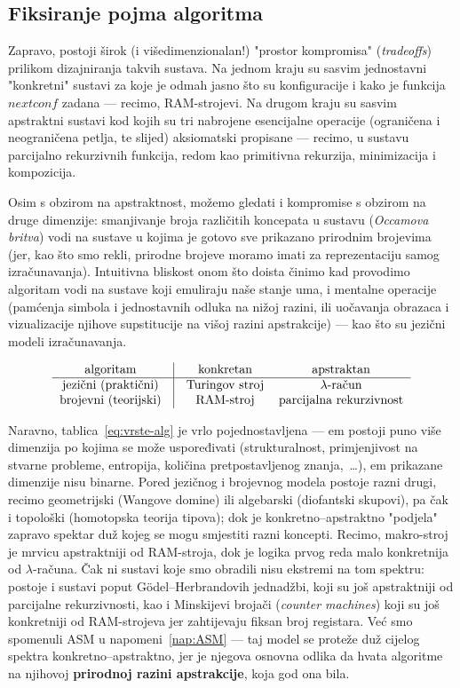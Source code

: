 \subsection{Fiksiranje pojma algoritma}

Zapravo, postoji širok (i višedimenzionalan!) "prostor kompromisa" (\emph{tradeoffs}) prilikom dizajniranja takvih sustava. Na jednom kraju su sasvim jednostavni "konkretni" sustavi za koje je odmah jasno što su konfiguracije i kako je funkcija $nextconf$ zadana --- recimo, RAM-strojevi. Na drugom kraju su sasvim apstraktni sustavi kod kojih su tri nabrojene esencijalne operacije (ograničena i neograničena petlja, te slijed) aksiomatski propisane --- recimo, u sustavu parcijalno rekurzivnih funkcija, redom kao primitivna rekurzija, minimizacija i kompozicija.

Osim s obzirom na apstraktnost, možemo gledati i kompromise s obzirom na druge dimenzije: smanjivanje broja različitih koncepata u sustavu (\emph{Occamova britva}) vodi na sustave u kojima je gotovo sve prikazano prirodnim brojevima (jer, kao što smo rekli, prirodne brojeve moramo imati za reprezentaciju samog izračunavanja). Intuitivna bliskost onom što doista činimo kad provodimo algoritam vodi na sustave koji emuliraju naše stanje uma, i mentalne operacije (pamćenja simbola i jednostavnih odluka na nižoj razini, ili uočavanja obrazaca i vizualizacije njihove supstitucije na višoj razini apstrakcije) --- kao što su jezični modeli izračunavanja.

\begin{equation}\label{eq:vrste-alg}
    \begin{tabular}{c@{\quad}|@{\quad}cc}
     algoritam & konkretan & apstraktan \\\hline
     jezični (praktični) & Turingov stroj & $\lambda$-račun\\
     brojevni (teorijski) & RAM-stroj & parcijalna rekurzivnost
    \end{tabular}
\end{equation}

Naravno, tablica~\eqref{eq:vrste-alg} je vrlo pojednostavljena --- em postoji puno više dimenzija po kojima se može uspoređivati (strukturalnost, primjenjivost na stvarne probleme, entropija, količina pretpostavljenog znanja,~\ldots), em prikazane dimenzije nisu binarne. Pored jezičnog i brojevnog modela postoje razni drugi, recimo geometrijski (Wangove domine) ili algebarski (diofantski skupovi), pa čak i topološki (homotopska teorija tipova); dok je konkretno--apstraktno "podjela" zapravo spektar duž kojeg se mogu smjestiti razni koncepti. Recimo, makro-stroj je mrvicu apstraktniji od RAM-stroja, dok je logika prvog reda malo konkretnija od $\lambda$-računa. Čak ni sustavi koje smo obradili nisu ekstremi na tom spektru: postoje i sustavi poput G\"odel--Herbrandovih jednadžbi, koji su još apstraktniji od parcijalne rekurzivnosti, kao i Minskijevi brojači (\emph{counter machines}) koji su još konkretniji od RAM-strojeva jer zahtijevaju fiksan broj registara. Već smo spomenuli ASM u napomeni~\ref{nap:ASM} --- taj model se proteže duž cijelog spektra konkretno--apstraktno, jer je njegova osnovna odlika da hvata algoritme na njihovoj \textbf{prirodnoj razini apstrakcije}, koja god ona bila.

